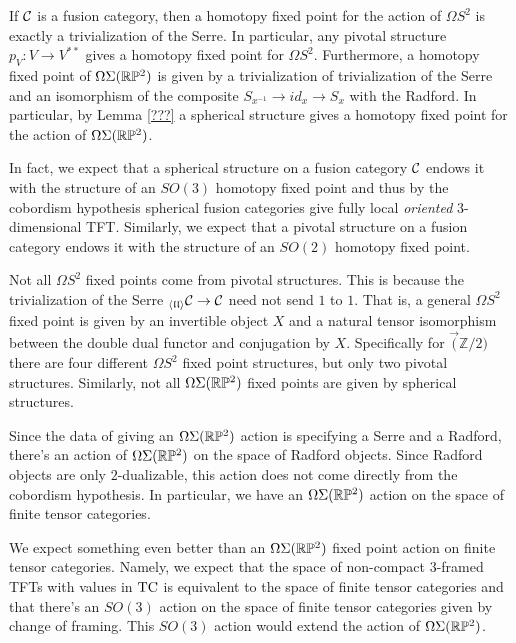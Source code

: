 \documentclass{amsart}
\begin{document}
If $\mathcal C$ is a fusion category, then a homotopy fixed point for the action of $\Omega S^2$ is exactly a trivialization of the Serre.  In particular, any pivotal structure $p_V: V \rightarrow V^{**}$  gives a homotopy fixed point for $\Omega S^2$.  Furthermore, a homotopy fixed point of $\Omega \Sigma (\mathbb R \mathbb P^2)$ is given by a trivialization of trivialization of the Serre and an isomorphism of the composite $S_{x^{-1}} \rightarrow id_x \rightarrow S_x$ with the Radford.  In particular, by Lemma \ref{???} a spherical structure gives a homotopy fixed point for the action of $\Omega \Sigma (\mathbb R \mathbb P^2)$.  

\begin{remark}
In fact, we expect that a spherical structure on a fusion category $\mathcal C$ endows it with the structure of an $SO(3)$ homotopy fixed point and thus by the cobordism hypothesis spherical fusion categories give fully local \emph{oriented} $3$-dimensional TFT.   Similarly, we expect that a pivotal structure on a fusion category endows it with the structure of an $SO(2)$ homotopy fixed point. 
\end{remark}


\begin{warning}
Not all $\Omega S^2$ fixed points come from pivotal structures.  This is because the trivialization of the Serre ${}_{\langle \mathfrak{l l} \rangle} \mathcal C \rightarrow \mathcal C$ need not send $1$ to $1$.  That is, a general $\Omega S^2$ fixed point is given by an invertible object $X$ and a natural tensor isomorphism between the double dual functor and conjugation by $X$.  Specifically for $\Vec(\mathbb{Z}/2)$ there are four different $\Omega S^2$ fixed point structures, but only two pivotal structures.  Similarly, not all $\Omega \Sigma (\mathbb R \mathbb P^2)$ fixed points are given by spherical structures.
\end{warning}

Since the data of giving an $\Omega \Sigma (\mathbb R \mathbb P^2)$ action is specifying a Serre and a Radford, there's an action of $\Omega \Sigma (\mathbb R \mathbb P^2)$ on the space of Radford objects.  Since Radford objects are only $2$-dualizable, this action does not come directly from the cobordism hypothesis.  In particular, we have an $\Omega \Sigma (\mathbb R \mathbb P^2)$ action on the space of finite tensor categories.  

\begin{remark}
We expect something even better than an $\Omega \Sigma (\mathbb R \mathbb P^2)$ fixed point action on finite tensor categories.  Namely, we expect that the space of non-compact $3$-framed TFTs with values in $\mathrm{TC}$ is equivalent to the space of finite tensor categories and that there's an $SO(3)$ action on the space of finite tensor categories given by change of framing.  This $SO(3)$ action would extend the action of $\Omega \Sigma (\mathbb R \mathbb P^2)$.
 \end{remark}
\end{document}
